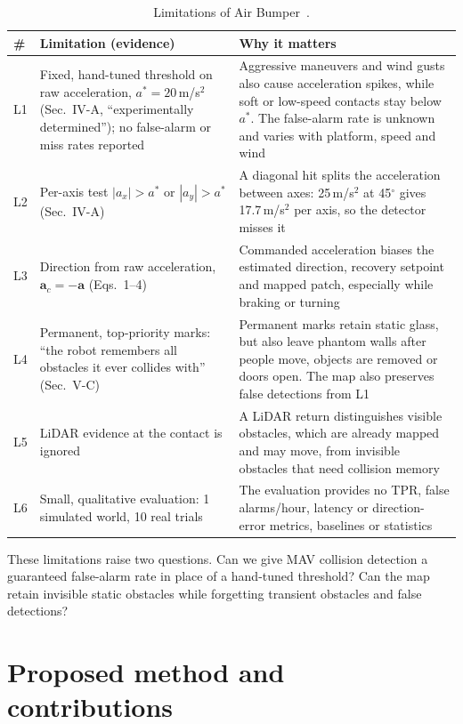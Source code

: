 \documentclass[conference,10pt]{IEEEtran}
\begin{document}
\begin{table}[t]
\caption{Limitations of Air Bumper~\cite{airbumper}.}
\label{tab:lim}
\footnotesize
\begin{tabularx}{\columnwidth}{@{}L{0.45cm}L{2.55cm}Y@{}}
\toprule
\# & \textbf{Limitation (evidence)} & \textbf{Why it matters}\\
\midrule
L1 & Fixed, hand-tuned threshold on raw acceleration, $a^*=20$\,m/s$^2$ (Sec.~IV-A, ``experimentally determined''); no false-alarm or miss rates reported & Aggressive maneuvers and wind gusts also cause acceleration spikes, while soft or low-speed contacts stay below $a^*$. The false-alarm rate is unknown and varies with platform, speed and wind\\
L2 & Per-axis test $|a_x|>a^*$ or $|a_y|>a^*$ (Sec.~IV-A) & A diagonal hit splits the acceleration between axes: 25\,m/s$^2$ at 45$^\circ$ gives 17.7\,m/s$^2$ per axis, so the detector misses it\\
L3 & Direction from raw acceleration, $\mathbf{a}_c=-\mathbf{a}$ (Eqs.~1--4) & Commanded acceleration biases the estimated direction, recovery setpoint and mapped patch, especially while braking or turning\\
L4 & Permanent, top-priority marks: ``the robot remembers all obstacles it ever collides with'' (Sec.~V-C) & Permanent marks retain static glass, but also leave phantom walls after people move, objects are removed or doors open. The map also preserves false detections from L1\\
L5 & LiDAR evidence at the contact is ignored & A LiDAR return distinguishes visible obstacles, which are already mapped and may move, from invisible obstacles that need collision memory\\
L6 & Small, qualitative evaluation: 1 simulated world, 10 real trials & The evaluation provides no TPR, false alarms/hour, latency or direction-error metrics, baselines or statistics\\
\bottomrule
\end{tabularx}
\end{table}

These limitations raise two questions. Can we give MAV collision detection a guaranteed false-alarm rate in place of a hand-tuned threshold? Can the map retain invisible static obstacles while forgetting transient obstacles and false detections?

\section{Proposed method and contributions}
\label{sec:method}
\end{document}
